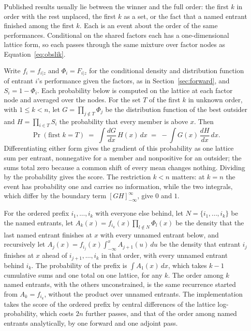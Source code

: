 \documentclass[11pt]{article}
\begin{document}
Published results usually lie between the winner and the full order:
the first $k$ in order with the rest unplaced, the first $k$ as a set,
or the fact that a named entrant finished among the first $k$. Each
is an event about the order of the same performances. Conditional on
the shared factors each has a one-dimensional lattice form, so each
passes through the same mixture over factor nodes as
Equation~\eqref{eq:obslik}.

Write $f_i=f_{i|z}$ and $\Phi_i=F_{i|z}$ for the conditional density
and distribution function of entrant $i$'s performance given the
factors, as in Section~\ref{sec:forward}, and $S_i=1-\Phi_i$. Each
probability below is computed on the lattice at each factor node and
averaged over the nodes. For the set
$T$ of the first $k$ in unknown order, with $1\le k<n$, let $G=\prod_{j\notin T}\Phi_j$
be the distribution function of the best outsider and
$H=\prod_{i\in T}S_i$ the probability that every member is above
$x$. Then
\begin{equation}
\Pr(\text{first } k = T)\;=\;\int \frac{dG}{dx}\,H(x)\,dx\;=\;-\int G(x)\,\frac{dH}{dx}\,dx .
\label{eq:topset}
\end{equation}
Differentiating either form gives the gradient of this probability
as one lattice sum per entrant, nonnegative for a member and
nonpositive for an outsider; the sums total zero because a common
shift of every mean changes nothing. Dividing by the probability gives
the score. The restriction $k<n$ matters: at $k=n$ the event has
probability one and carries no information, while the two integrals,
which differ by the boundary term $[GH]_{-\infty}^{\infty}$, give $0$
and $1$.

For the ordered prefix $i_1,\dots,i_k$ with everyone else
behind, let $N=\{i_1,\dots,i_k\}$ be the named entrants, let
$A_k(x)=f_{i_k}(x)\prod_{l\notin N}\Phi_l(x)$ be the density that
the last named entrant finishes at $x$ with every unnamed entrant
below, and recursively let
$A_j(x)=f_{i_j}(x)\int_{-\infty}^{x}A_{j+1}(u)\,du$ be the density
that entrant $i_j$ finishes at $x$ ahead of $i_{j+1},\dots,i_k$ in
that order, with every unnamed entrant behind $i_k$. The probability
of the prefix is $\int A_1(x)\,dx$, which takes $k-1$ cumulative sums
and one total on one lattice, for any $k$. The order among $k$ named
entrants, with the others unconstrained, is the same recurrence
started from $A_k=f_{i_k}$, without the product over unnamed
entrants. The implementation takes the score of the ordered prefix by central
differences of the lattice log-probability, which costs $2n$ further
passes, and that of the order among named entrants analytically, by
one forward and one adjoint pass.
\end{document}
